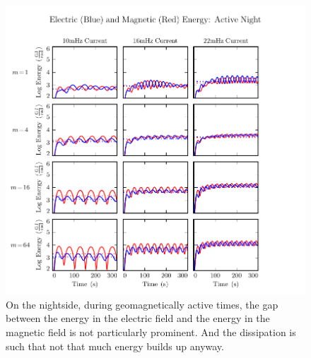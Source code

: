 \begin{figure}[H]
    \centering
    \includegraphics[width=\textwidth]{figures/UB_UE_J_3.pdf}
    \caption[Current-Driven Electric and Magnetic Energy: Active Night]{
      On the nightside, during geomagnetically active times, the gap between the energy in the electric field and the energy in the magnetic field is not particularly prominent. And the dissipation is such that not that much energy builds up anyway. 
    }
    \label{fig_UB_UE_J_3}
\end{figure}

